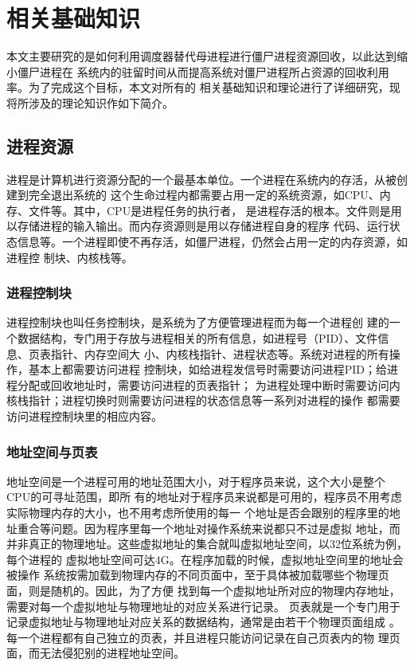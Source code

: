 \documentclass{swfuthesism}
\begin{document}
\section{相关基础知识}

本文主要研究的是如何利用调度器替代母进程进行僵尸进程资源回收，以此达到缩小僵尸进程在
系统内的驻留时间从而提高系统对僵尸进程所占资源的回收利用率。为了完成这个目标，本文对所有的
相关基础知识和理论进行了详细研究，现将所涉及的理论知识作如下简介。

\subsection{进程资源}

进程是计算机进行资源分配的一个最基本单位。一个进程在系统内的存活，从被创建到完全退出系统的
这个生命过程内都需要占用一定的系统资源，如CPU、内存、文件等。其中，CPU是进程任务的执行者，
是进程存活的根本。文件则是用以存储进程的输入输出。而内存资源则是用以存储进程自身的程序
代码、运行状态信息等。一个进程即使不再存活，如僵尸进程，仍然会占用一定的内存资源，如进程控
制块、内核栈等。 

\subsubsection{进程控制块}

进程控制块也叫任务控制块\cite{tanenbaum2008modern}，是系统为了方便管理进程而为每一个进程创
建的一个数据结构，专门用于存放与进程相关的所有信息，如进程号（PID）、文件信息、页表指针、内存空间大
小、内核栈指针、进程状态等\cite{stallings11os}。系统对进程的所有操作，基本上都需要访问进程
控制块，如给进程发信号时需要访问进程PID；给进程分配或回收地址时，需要访问进程的页表指针；
为进程处理中断时需要访问内核栈指针；进程切换时则需要访问进程的状态信息等一系列对进程的操作
都需要访问进程控制块里的相应内容。

\subsubsection{地址空间与页表}

地址空间是一个进程可用的地址范围大小，对于程序员来说，这个大小是整个CPU的可寻址范围，即所
有的地址对于程序员来说都是可用的，程序员不用考虑实际物理内存的大小，也不用考虑所使用的每一
个地址是否会跟别的程序里的地址重合等问题。因为程序里每一个地址对操作系统来说都只不过是虚拟
地址，而并非真正的物理地址。这些虚拟地址的集合就叫虚拟地址空间，以32位系统为例，每个进程的
虚拟地址空间可达4G\cite{IBMKnowl68:online}。在程序加载的时候，虚拟地址空间里的地址会被操作
系统按需加载到物理内存的不同页面中，至于具体被加载哪些个物理页面，则是随机的。因此，为了方便
找到每一个虚拟地址所对应的物理内存地址，需要对每一个虚拟地址与物理地址的对应关系进行记录。
页表就是一个专门用于记录虚拟地址与物理地址对应关系的数据结构，通常是由若干个物理页面组成
\cite{linux2.6.11protocol}。每一个进程都有自己独立的页表，并且进程只能访问记录在自己页表内的物
理页面，而无法侵犯别的进程地址空间。
\end{document}
